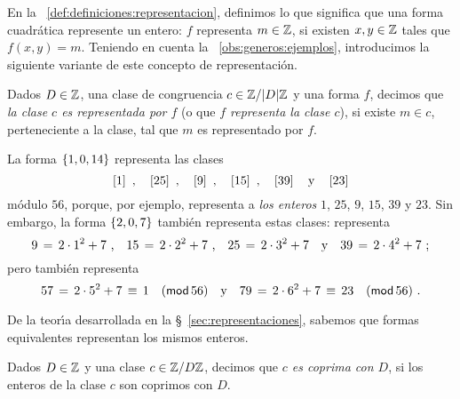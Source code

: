 En la ~\ref{def:definiciones:representacion}, definimos lo que
significa que una forma cuadr\'atica represente un entero: $f$ representa
$m\in\Enteros$, si existen $x,y\in\Enteros$ tales que $f(x,y)=m$.
Teniendo en cuenta la \obsname~\ref{obs:generos:ejemplos}, introducimos
la siguiente variante de este concepto de representaci\'on.

\begin{defGeneros}\label{def:generos:representacion:mod}
	Dados $D\in\Enteros$, una clase de congruencia
	$c\in\Enterosmod[|D|]$ y una forma $f$, decimos que
	\emph{la clase $c$ es representada por $f$} (o que \emph{$f$ %
	representa la clase $c$}), si existe $m\in c$, perteneciente a la
	clase, tal que $m$ es representado por $f$.
\end{defGeneros}

\begin{ejemGeneros}\label{ejem:generos:representacion:mod}
	La forma $\binaria{1,0,14}$ representa las clases
	\begin{displaymath}
		\clase 1\dispcomma\quad
		\clase{25}\dispcomma\quad
		\clase 9\dispcomma\quad
		\clase{15}\dispcomma\quad
		\clase{39}\dispand
		\clase{23}
	\end{displaymath}
	m\'odulo $56$, porque, por ejemplo, representa a \emph{los enteros}
	$1$, $25$, $9$, $15$, $39$ y $23$. Sin embargo, la forma
	$\binaria{2,0,7}$ tambi\'en representa estas clases:
	representa
	\begin{displaymath}
		9\,=\,2\cdot 1^2+7\dispcomma\quad
		15\,=\,2\cdot 2^2+7\dispcomma\quad
		25\,=\,2\cdot 3^2+7\dispand
		39\,=\,2\cdot 4^2+7
		\text{ ;}
	\end{displaymath}
	pero tambi\'en representa
	\begin{displaymath}
		57\,=\,2\cdot 5^2+7\,\equiv\,1\modulo[56]
		\dispand
		79\,=\,2\cdot 6^2+7\,\equiv\,23\modulo[56]
		\dispstop
	\end{displaymath}
\end{ejemGeneros}

De la teor\'{\i}a desarrollada en la \S~\ref{sec:representaciones}, sabemos
que formas equivalentes representan los mismos enteros.


\begin{defGeneros}\label{def:generos:clases-coprimas}
	Dados $D\in\Enteros$ y una clase $c\in\Enterosmod[D]$, decimos
	que \emph{$c$ es coprima con $D$}, si los enteros de la clase
	$c$ son coprimos con $D$.
\end{defGeneros}

